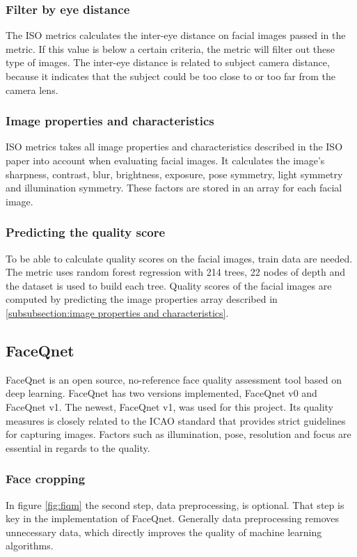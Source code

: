 \subsubsection*{Filter by eye distance}
The ISO metrics calculates the inter-eye distance on facial images passed in the metric. If this value is below a certain criteria, the metric will filter out these type of images. The inter-eye distance is related to subject camera distance, because it indicates that the subject could be too close to or too far from the camera lens. 

\subsubsection*{Image properties and characteristics}
\label{subsubsection:image properties and characteristics}
ISO metrics takes all image properties and characteristics described in the ISO paper into account when evaluating facial images. It calculates the image's sharpness, contrast, blur, brightness, exposure, pose symmetry, light symmetry and illumination symmetry. These factors are stored in an array for each facial image. 

\subsubsection*{Predicting the quality score}
To be able to calculate quality scores on the facial images, train data are needed. The metric uses random forest regression \cite{RandomForestRegressor} with 214 trees, 22 nodes of depth and the dataset is used to build each tree. Quality scores of the facial images are computed by predicting the image properties array described in \ref{subsubsection:image properties and characteristics}. 

\subsection{FaceQnet}
FaceQnet \cite{FaceQnet} is an open source, no-reference face quality assessment tool based on deep learning. FaceQnet has two versions implemented, FaceQnet v0 and FaceQnet v1. The newest, FaceQnet v1, was used for this project. Its quality measures is closely related to the ICAO \cite{ICAO2} standard that provides strict guidelines for capturing images. Factors such as illumination, pose, resolution and focus are essential in regards to the quality.

\subsubsection*{Face cropping}
In figure \ref{fig:fiqm} the second step, data preprocessing, is optional. That step is key in the implementation of FaceQnet. Generally data preprocessing removes unnecessary data, which directly improves the quality of machine learning algorithms. 

